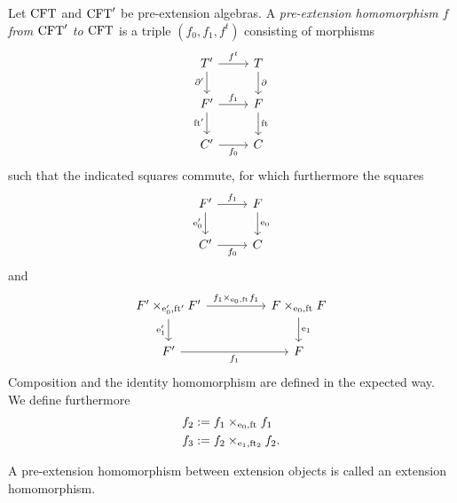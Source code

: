 \begin{defn}
Let $\mathrm{CFT}$ and $\mathrm{CFT}'$ be pre-extension algebras. A \emph{pre-extension 
homomorphism $f$ from $\mathrm{CFT}'$ to $\mathrm{CFT}$} is a triple $(f_0,f_1,f^t)$ 
consisting of morphisms
\begin{equation*}
\begin{tikzcd}
\stesyst' 
  \ar{r}{f^t}
  \ar{d}[swap]{\ebd'}
  &
\stesyst
  \ar{d}{\ebd}
  \\
\stesysf'
  \ar{r}{f_1}
  \ar{d}[swap]{\eft'}
  &
\stesysf
  \ar{d}{\eft}
  \\
\stesysc' 
  \ar{r}[swap]{f_0}
  &
\stesysc
\end{tikzcd}
\end{equation*}
such that the indicated squares commute, for which furthermore the squares
\begin{equation*}
\begin{tikzcd}
\stesysf' 
  \ar{r}{f_1}
  \ar{d}[swap]{\ectxext'}
  &
\stesysf
  \ar{d}{\ectxext}
  \\
\stesysc'
  \ar{r}[swap]{f_0}
  &
\stesysc
\end{tikzcd}
\end{equation*}
and
\begin{equation*}
\begin{tikzcd}[column sep=huge]
\stesysf'\times_{\ectxext',\eft'} \stesysf'
  \ar{r}{f_1\times_{\ectxext,\eft} f_1}
  \ar{d}[swap]{\efamext'}
  &
\stesysf\times_{\ectxext,\eft} \stesysf
  \ar{d}{\efamext}
  \\
\stesysf'
  \ar{r}[swap]{f_1}
  &
\stesysf
\end{tikzcd}
\end{equation*}
Composition and the identity homomorphism are defined in the expected way. We
define furthermore
\begin{align*}
f_2 & := \pullback{f_1}{f_1}{\ectxext}{\eft}
  \\
f_3 & := \pullback{f_2}{f_2}{\efamext}{\eft[2]}.
\end{align*}
\end{defn}

\begin{defn}
A pre-extension homomorphism between extension objects is called an extension
homomorphism.
\end{defn}

